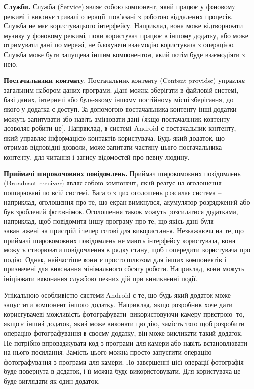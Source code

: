 \documentclass[../main.tex]{subfiles}
\begin{document}
\textbf{Служби.} Служба (Service) являє собою компонент, який працює у фоновому режимі і виконує тривалі операції, пов'язані з роботою віддалених процесів. Служба не має користувацього інтерфейсу. Наприклад, вона може відтворювати музику у фоновому режимі, поки користувач працює в іншому додатку, або може отримувати дані по мережі, не блокуючи взаємодію користувача з операцією. Служба може бути запущена іншим компонентом, який потім буде взаємодіяти з нею.

\textbf{Постачальники контенту.} Постачальник контенту (Content provider) управляє загальним набором даних програми. Дані можна зберігати в файловій системі, базі даних, інтернеті або будь-якому іншому постійному місці зберігання, до якого у додатка є доступ. За допомогою постачальника контенту інші додатки можуть запитувати або навіть змінювати дані (якщо постачальник контенту дозволяє робити це). Наприклад, в системі Android є постачальник контенту, який управляє інформацією контактів користувача. Будь-який додаток, що отримав відповідні дозволи, може запитати частину цього постачальника контенту, для читання і запису відомостей про певну людину.

\textbf{Приймачі широкомовних повідомлень.} Приймач широкомовних повідомлень (Broadcast receiver) являє собою компонент, який реагує на оголошення поширювані по всій системі. Багато з цих оголошень розсилає система -- наприклад, оголошення про те, що екран вимкнувся, акумулятор розряджений або був зроблений фотознімок. Оголошення також можуть розсилатися додатками, наприклад, щоб повідомити іншу програму про те, що якісь дані були завантажені на пристрій і тепер готові для використання. Незважаючи на те, що приймачі широкомовних повідомлень не мають інтерфейсу користувача, вони можуть створювати повідомлення в рядку стану, щоб попередити користувача про подію. Однак, найчастіше вони є просто шлюзом для інших компонентів і призначені для виконання мінімального обсягу роботи. Наприклад, вони можуть ініціювати виконання службою певних дій при виникненні події.

Унікальною особливістю системи Android є те, що будь-який додаток може запустити компонент іншого додатку. Наприклад, якщо розробник хоче дати користувачеві можливість фотографувати, використовуючи камеру пристрою, то, якщо є інший додаток, який може виконати цю дію, замість того щоб розробити операцію фотографування в своєму додатку, він може викликати такий додаток. Не потрібно впроваджувати код з програми для камери або навіть встановлювати на нього посилання. Замість цього можна просто запустити операцію фотографування з програми для камери. По завершенні цієї операції фотографія буде повернута в додаток, і її можна буде використовувати. Для користувача це буде виглядати як один додаток.
\end{document}
